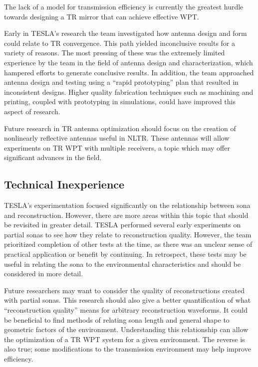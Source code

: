 The lack of a model for transmission efficiency is currently the greatest hurdle towards designing a TR mirror that can achieve effective WPT.

Early in TESLA’s research the team investigated how antenna design and form could relate to TR convergence.  This path yielded inconclusive results for a variety of reasons. The most pressing of these was the extremely limited experience by the team in the field of antenna design and characterization, which hampered efforts to generate conclusive results.  In addition, the team approached antenna design and testing using a “rapid prototyping” plan that resulted in inconsistent designs.  Higher quality fabrication techniques such as machining and printing, coupled with prototyping in simulations, could have improved this aspect of research.

Future research in TR antenna optimization should focus on the creation of nonlinearly reflective antennas useful in NLTR.  These antennas will allow experiments on TR WPT with multiple receivers, a topic which may offer significant advances in the field.

\subsection{Technical Inexperience}

TESLA’s experimentation focused significantly on the relationship between sona and reconstruction.  However, there are more areas within this topic that should be revisited in greater detail.  TESLA performed several early experiments on partial sonas to see how they relate to reconstruction quality.  However, the team prioritized completion of other tests at the time, as there was an unclear sense of practical application or benefit by continuing.  In retrospect, these tests may be useful in relating the sona to the environmental characteristics and should be considered in more detail.

Future researchers may want to consider the quality of reconstructions created with partial sonas.  This research should also give a better quantification of what “reconstruction quality” means for arbitrary reconstruction waveforms. It could be beneficial to find methods of relating sona length and general shape to geometric factors of the environment. Understanding this relationship can allow the optimization of a TR WPT system for a given environment. The reverse is also true; some modifications to the transmission environment may help improve efficiency.

